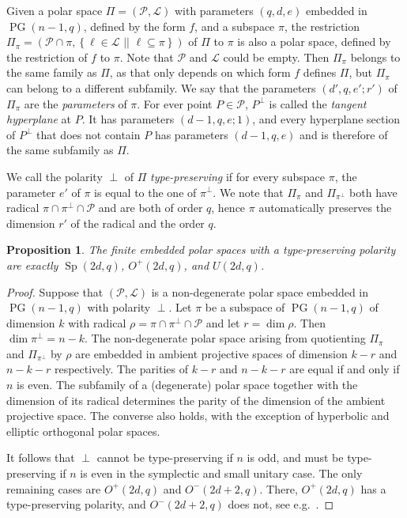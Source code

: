 \documentclass[a4paper]{article}
\newtheorem{prop}[thm]{Proposition}
\theoremstyle{definition}
\newcommand{\sett}[2]{ \left\{ #1 \, \, || \, \, #2 \right \} }
\newcommand{\ml}{\mathcal L}
\renewcommand{\mp}{\mathcal P}
\DeclareMathOperator{\PG}{PG}
\newcommand{\pg}{\PG}
\DeclareMathOperator{\Sp}{Sp}
\begin{document}
\bigskip

Given a polar space $\Pi = (\mp,\ml)$ with parameters $(q,d,e)$ embedded in $\pg(n-1,q)$, defined by the form $f$, and a subspace $\pi$, the restriction $\Pi_\pi = (\mp\cap \pi, \sett{ \ell \in \ml}{\ell \subseteq \pi })$ of $\Pi$ to $\pi$ is also a polar space, defined by the restriction of $f$ to $\pi$.
Note that $\mp$ and $\ml$ could be empty.
Then $\Pi_\pi$ belongs to the same family as $\Pi$, as that only depends on which form $f$ defines $\Pi$, but $\Pi_\pi$ can belong to a different subfamily.
We say that the parameters $(d',q,e';r')$ of $\Pi_\pi$ are the \emph{parameters} of $\pi$.
For ever point $P \in \mp$, $P^\perp$ is called the \emph{tangent hyperplane} at $P$.
It has parameters $(d-1,q,e;1)$, and every hyperplane section of $P^\perp$ that does not contain $P$ has parameters $(d-1,q,e)$ and is therefore of the same subfamily as $\Pi$.

We call the polarity $\perp$ of $\Pi$ \emph{type-preserving} if for every subspace $\pi$, the parameter $e'$ of $\pi$ is equal to the one of $\pi^\perp$.
We note that $\Pi_\pi$ and $\Pi_{\pi^\perp}$ both have radical $\pi \cap \pi^\perp \cap \mp$ and are both of order $q$, hence $\pi$ automatically preserves the dimension $r'$ of the radical and the order $q$.

\begin{prop}
 \label{Prop:Type preserving}
 The finite embedded polar spaces with a type-preserving polarity are exactly $\Sp(2d,q)$, $O^+(2d,q)$, and $U(2d,q)$.
\end{prop}

\begin{proof}
 Suppose that $(\mp,\ml)$ is a non-degenerate polar space embedded in $\pg(n-1,q)$ with polarity $\perp$.
 Let $\pi$ be a subspace of $\pg(n-1,q)$ of dimension $k$ with radical $\rho = \pi \cap \pi^\perp \cap \mp$ and let $r = \dim \rho$.
 Then $\dim \pi^\perp = n - k$.
 The non-degenerate polar space arising from quotienting $\Pi_\pi$ and $\Pi_{\pi^\perp}$ by $\rho$ are embedded in ambient projective spaces of dimension $k-r$ and $n-k-r$ respectively.
 The parities of $k-r$ and $n-k-r$ are equal if and only if $n$ is even.
 The subfamily of a (degenerate) polar space together with the dimension of its radical determines the parity of the dimension of the ambient projective space.
 The converse also holds, with the exception of hyperbolic and elliptic orthogonal polar spaces.
 
 It follows that $\perp$ cannot be type-preserving if $n$ is odd, and must be type-preserving if $n$ is even in the symplectic and small unitary case.
 The only remaining cases are $O^+(2d,q)$ and $O^-(2d+2,q)$.
 There, $O^+(2d,q)$ has a type-preserving polarity, and $O^-(2d+2,q)$ does not, see e.g.\ \cite[Table 1.4]{Hirschfeld:Thas}.
\end{proof}
\end{document}
